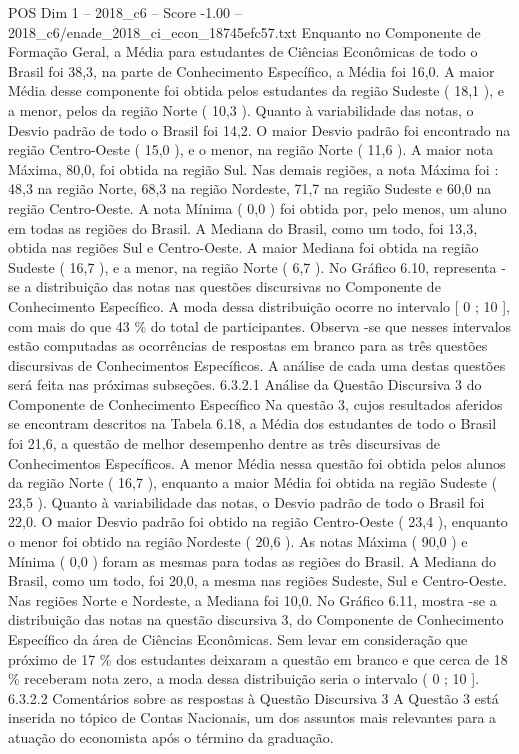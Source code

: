 \begin{textsample}{POS Dim 1 – 2018\_c6 – Score -1.00 – 2018\_c6/enade\_2018\_ci\_econ\_18745efc57.txt}
Enquanto no Componente de Formação Geral, a Média para estudantes de Ciências Econômicas de todo o Brasil foi 38,3, na parte de Conhecimento Específico, a Média foi 16,0.
A maior Média desse componente foi obtida pelos estudantes da região Sudeste ( 18,1 ), e a menor, pelos da região Norte ( 10,3 ).
Quanto à variabilidade das notas, o Desvio padrão de todo o Brasil foi 14,2.
O maior Desvio padrão foi encontrado na região Centro-Oeste ( 15,0 ), e o menor, na região Norte ( 11,6 ).
A maior nota Máxima, 80,0, foi obtida na região Sul.
Nas demais regiões, a nota Máxima foi : 48,3 na região Norte, 68,3 na região Nordeste, 71,7 na região Sudeste e 60,0 na região Centro-Oeste.
A nota Mínima ( 0,0 ) foi obtida por, pelo menos, um aluno em todas as regiões do Brasil.
A Mediana do Brasil, como um todo, foi 13,3, obtida nas regiões Sul e Centro-Oeste.
A maior Mediana foi obtida na região Sudeste ( 16,7 ), e a menor, na região Norte ( 6,7 ).
No Gráfico 6.10, representa -se a distribuição das notas nas questões discursivas no Componente de Conhecimento Específico.
A moda dessa distribuição ocorre no intervalo [ 0 ; 10 ], com mais do que 43 \% do total de participantes.
Observa -se que nesses intervalos estão computadas as ocorrências de respostas em branco para as três questões discursivas de Conhecimentos Específicos.
A análise de cada uma destas questões será feita nas próximas subseções. 6.3.2.1 Análise da Questão Discursiva 3 do Componente de Conhecimento Específico Na questão 3, cujos resultados aferidos se encontram descritos na Tabela 6.18, a Média dos estudantes de todo o Brasil foi 21,6, a questão de melhor desempenho dentre as três discursivas de Conhecimentos Específicos.
A menor Média nessa questão foi obtida pelos alunos da região Norte ( 16,7 ), enquanto a maior Média foi obtida na região Sudeste ( 23,5 ).
Quanto à variabilidade das notas, o Desvio padrão de todo o Brasil foi 22,0.
O maior Desvio padrão foi obtido na região Centro-Oeste ( 23,4 ), enquanto o menor foi obtido na região Nordeste ( 20,6 ).
As notas Máxima ( 90,0 ) e Mínima ( 0,0 ) foram as mesmas para todas as regiões do Brasil.
A Mediana do Brasil, como um todo, foi 20,0, a mesma nas regiões Sudeste, Sul e Centro-Oeste.
Nas regiões Norte e Nordeste, a Mediana foi 10,0.
No Gráfico 6.11, mostra -se a distribuição das notas na questão discursiva 3, do Componente de Conhecimento Específico da área de Ciências Econômicas.
Sem levar em consideração que próximo de 17 \% dos estudantes deixaram a questão em branco e que cerca de 18 \% receberam nota zero, a moda dessa distribuição seria o intervalo ( 0 ; 10 ]. 6.3.2.2 Comentários sobre as respostas à Questão Discursiva 3 A Questão 3 está inserida no tópico de Contas Nacionais, um dos assuntos mais relevantes para a atuação do economista após o término da graduação.

\end{textsample}
